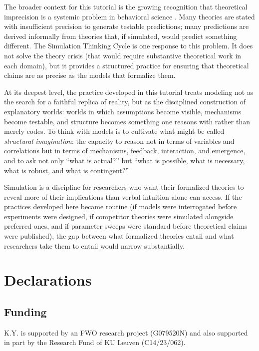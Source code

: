 \documentclass[fleqn,10pt]{wlscirep}
\begin{document}
\begin{linenumbers}
The broader context for this tutorial is the growing recognition that theoretical imprecision is a systemic problem in behavioral science \citep{meehl1990summaries, oberauer2019addressing, robinaugh2021invisible, eronen2021theory}. Many theories are stated with insufficient precision to generate testable predictions; many predictions are derived informally from theories that, if simulated, would predict something different. The Simulation Thinking Cycle is one response to this problem. It does not solve the theory crisis (that would require substantive theoretical work in each domain), but it provides a structured practice for ensuring that theoretical claims are as precise as the models that formalize them.

At its deepest level, the practice developed in this tutorial treats modeling not as the search for a faithful replica of reality, but as the disciplined construction of explanatory worlds: worlds in which assumptions become visible, mechanisms become testable, and structure becomes something one reasons with rather than merely codes. To think with models is to cultivate what might be called \emph{structural imagination}: the capacity to reason not in terms of variables and correlations but in terms of mechanisms, feedback, interaction, and emergence, and to ask not only ``what is actual?'' but ``what is possible, what is necessary, what is robust, and what is contingent?''

Simulation is a discipline for researchers who want their formalized theories to reveal more of their implications than verbal intuition alone can access. If the practices developed here became routine (if models were interrogated before experiments were designed, if competitor theories were simulated alongside preferred ones, and if parameter sweeps were standard before theoretical claims were published), the gap between what formalized theories entail and what researchers take them to entail would narrow substantially.

\end{linenumbers}

\section*{Declarations}

\subsection*{Funding}
K.Y. is supported by an FWO research project (G079520N) and also supported in part by the Research Fund of KU Leuven (C14/23/062).
\end{document}
